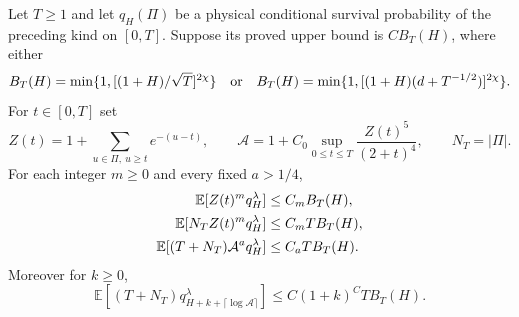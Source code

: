 \begin{proposition}
\label{pr:palm}
Let $T\ge1$ and let $q_H(\Pi)$ be a physical conditional survival
probability of the preceding kind on $[0,T]$. Suppose its proved upper
bound is $C B_T(H)$, where either
\[
 B_T(H)=\min\{1,[(1+H)/\sqrt T]^{2\chi}\}
 \quad\hbox{or}\quad
 B_T(H)=\min\{1,[(1+H)(d+T^{-1/2})]^{2\chi}\}.
\]
For $t\in[0,T]$ set
\[
 Z(t)=1+\sum_{u\in\Pi,\ u\ge t}e^{-(u-t)},\qquad
 \mathcal A=1+C_0\sup_{0\le t\le T}\frac{Z(t)^5}{(2+t)^4},
 \qquad N_T=|\Pi|.
\]
For each integer $m\ge0$ and every fixed $a>1/4$,
\begin{align}
 \mathbb E[Z(t)^m q_H^\lambda]&\le C_m B_T(H),\notag\\
 \mathbb E[N_T Z(t)^m q_H^\lambda]&\le C_m T B_T(H),\notag\\
 \mathbb E[(T+N_T)\mathcal A^a q_H^\lambda]
                                      &\le C_a T B_T(H).    \label{pr:palmweighted}
\end{align}
Moreover for $k\ge0$,
\begin{equation}
 \mathbb E[(T+N_T)
       q_{H+k+\lceil\log\mathcal A\rceil}^{\lambda}]
                          \le C(1+k)^C T B_T(H).             \label{pr:randomreserve}
\end{equation}
\end{proposition}
